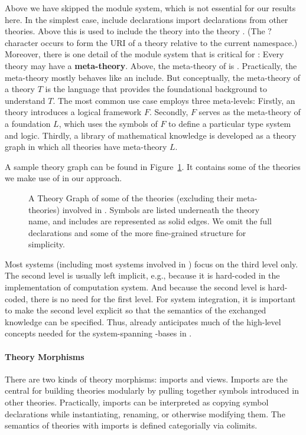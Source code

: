 Above we have skipped the \MMT module system, which is not essential for our results here.
In the simplest case, include declarations import declarations from other theories. Above this is used to include the theory  into the theory . (The $?$ character occurs to form the URI of a theory relative to the current namespace.)
Moreover, there is one detail of the \MMT module system that is critical for \pn: Every theory may have a \textbf{meta-theory}.
Above, the meta-theory of  is .
Practically, the meta-theory mostly behaves like an include.
But conceptually, the meta-theory of a theory $T$ is the language that provides the foundational background to understand $T$.
The most common use case employs three meta-levels: Firstly, an \MMT theory introduces a logical framework $F$.
Secondly, $F$ serves as the meta-theory of a foundation $L$, which uses the symbols of $F$ to define a particular type system and logic.
Thirdly, a library of mathematical knowledge is developed as a theory graph in which all theories have meta-theory $L$.

A sample theory graph can be found in Figure~\ref{fig:odk_theories}.
It contains some of the theories we make use of in our approach.

\begin{figure}[ht]\centering
  \providecommand\myxscale{3}
  \providecommand\myyscale{1.5}
  \providecommand\myfontsize{\footnotesize}
             
  \caption[Theories involved in our architecture]{A Theory Graph of some of the theories (excluding their meta-theories)
    involved in \pn.  Symbols are listed underneath the theory name, and includes are represented as solid edges.  We omit the full
    declarations and some of the more fine-grained structure for simplicity.  }
  \label{fig:odk_theories}
\end{figure}


Most systems (including most systems involved in \pn) focus on the third level only.
The second level is usually left implicit, e.g., because it is hard-coded in the implementation of computation system.
And because the second level is hard-coded, there is no need for the first level.
For system integration, it is important to make the second level explicit so that the semantics of the exchanged knowledge can be specified.
Thus, \MMT already anticipates much of the high-level concepts needed for the system-spanning \DKS-bases in \pn.

\paragraph{Theory Morphisms}
There are two kinds of theory morphisms: imports and views.  Imports are the central for
building theories modularly by pulling together symbols introduced in other theories.
Practically, imports can be interpreted as copying symbol declarations while
instantiating, renaming, or otherwise modifying them.  The semantics of theories with
imports is defined categorially via colimits.

